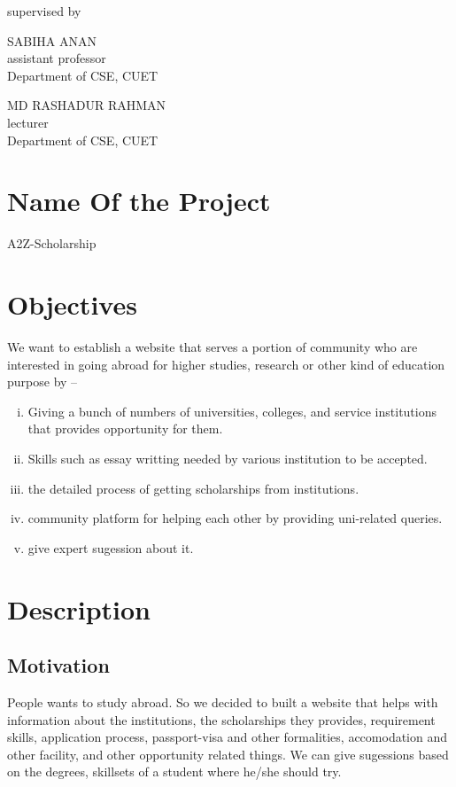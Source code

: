 \documentclass[a4paper,12pt]{report}
\begin{document}
\begin{titlepage}
\vspace{1cm}
	supervised by

	\parbox[l]{8cm}{\begin{center}

			SABIHA ANAN\\
			assistant professor\\
			Department of CSE, CUET
		\end{center}
	}
	\parbox[r]{8cm}{\begin{center}

			MD RASHADUR RAHMAN\\
			lecturer \\
			Department of CSE, CUET
		\end{center}
	}

	\vfill
\end{titlepage}


\onehalfspacing

\section*{Name Of the Project}
A2Z-Scholarship
\section*{Objectives}
We want to establish a website that serves a portion of community who are interested in going abroad for higher studies, research or other kind of education purpose by --
\begin{enumerate}[i.]
	\item Giving a bunch of numbers of universities, colleges, and service institutions that provides opportunity for them.
\item Skills such as essay writting needed by various institution to be accepted.
\item the detailed process of getting scholarships from institutions.
\item community platform for helping each other by providing uni-related queries.
	\item give expert sugession about it.
\end{enumerate}
\section*{Description}
\subsection*{Motivation}
People wants to study abroad. So we decided to built a website that helps with information about the institutions, the scholarships they provides, requirement skills, application process, passport-visa and other formalities, accomodation and other facility, and other opportunity related things. We can give sugessions based on the degrees, skillsets of a student where he/she should try.
\end{document}

